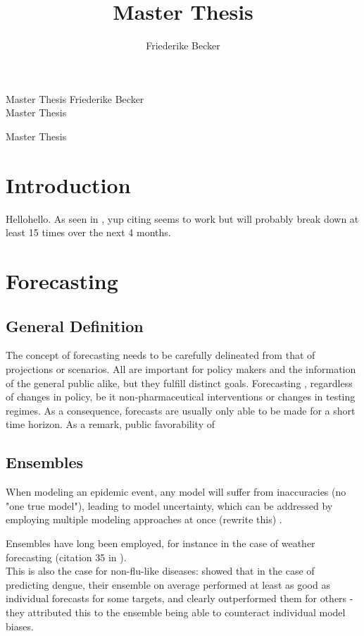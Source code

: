\documentclass[11pt]{article}
\title{Master Thesis}
\author{Friederike Becker}
\begin{document}
\onehalfspacing

\noindent
Master Thesis  \hfill Friederike Becker \\
Master Thesis\\
\begin{center}

\Large{Master Thesis} 
\end{center}

\normalsize
\vspace{2cm}
\section{Introduction}
Hellohello. As seen in \cite{bracher_pre-registered_2021}, yup citing seems to work but will probably break down at least 15 times over the next 4 months. 
\section{Forecasting}
\subsection{General Definition}
The concept of forecasting needs to be carefully delineated from that of projections or scenarios. All are important for policy makers and the information of the general public alike, but they fulfill distinct goals. Forecasting , regardless of changes in policy, be it non-pharmaceutical interventions or changes in testing regimes. As a consequence, forecasts are usually only able to be made for a short time horizon. As a remark, public favorability of 
\subsection{Ensembles}
When modeling an epidemic event, any model will suffer from inaccuracies (no "one true model"), leading to model uncertainty, which can be addressed by employing multiple modeling approaches at once (rewrite this) \cite{zelner_accounting_2021}.

Ensembles have long been employed, for instance in the case of weather forecasting (citation 35 in \cite{yamana_superensemble_2016}).\\
This is also the case for non-flu-like diseases: \cite{yamana_superensemble_2016} showed that in the case of predicting dengue, their ensemble on average performed at least as good as individual forecasts for some targets, and clearly outperformed them for others - they attributed this to the ensemble being able to counteract individual model biases.
\end{document}
